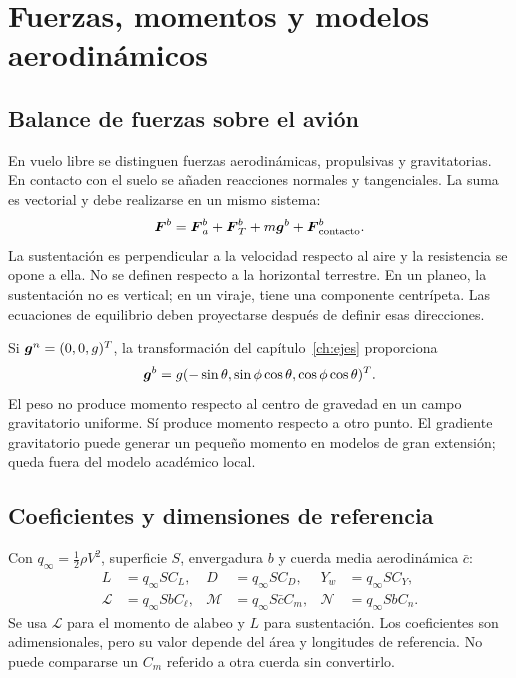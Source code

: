 \chapter{Fuerzas, momentos y modelos aerodinámicos}\label{ch:fuerzas}

\section{Balance de fuerzas sobre el avión}
En vuelo libre se distinguen fuerzas aerodinámicas, propulsivas y gravitatorias. En contacto con el suelo se añaden reacciones normales y tangenciales. La suma es vectorial y debe realizarse en un mismo sistema:
\begin{equation}
\boldsymbol{F}^b=\boldsymbol{F}_a^b+\boldsymbol{F}_T^b+m\boldsymbol{g}^b+\boldsymbol{F}_{\rm contacto}^b.
\end{equation}
La sustentación es perpendicular a la velocidad respecto al aire y la resistencia se opone a ella. No se definen respecto a la horizontal terrestre. En un planeo, la sustentación no es vertical; en un viraje, tiene una componente centrípeta. Las ecuaciones de equilibrio deben proyectarse después de definir esas direcciones.

Si $\boldsymbol{g}^n=(0,0,g)^T$, la transformación del capítulo~\ref{ch:ejes} proporciona
\begin{equation}
\boldsymbol{g}^b=g(-\sin\theta,\sin\phi\cos\theta,\cos\phi\cos\theta)^T.
\end{equation}
El peso no produce momento respecto al centro de gravedad en un campo gravitatorio uniforme. Sí produce momento respecto a otro punto. El gradiente gravitatorio puede generar un pequeño momento en modelos de gran extensión; queda fuera del modelo académico local.

\section{Coeficientes y dimensiones de referencia}
Con $q_\infty=\tfrac12\rho V^2$, superficie $S$, envergadura $b$ y cuerda media aerodinámica $\bar c$:
\begin{align}
L&=q_\infty SC_L,&D&=q_\infty SC_D,&Y_w&=q_\infty SC_Y,\\
\mathcal L&=q_\infty SbC_\ell,&\mathcal M&=q_\infty S\bar cC_m,&\mathcal N&=q_\infty SbC_n.
\end{align}
Se usa $\mathcal L$ para el momento de alabeo y $L$ para sustentación. Los coeficientes son adimensionales, pero su valor depende del área y longitudes de referencia. No puede compararse un $C_m$ referido a otra cuerda sin convertirlo.

